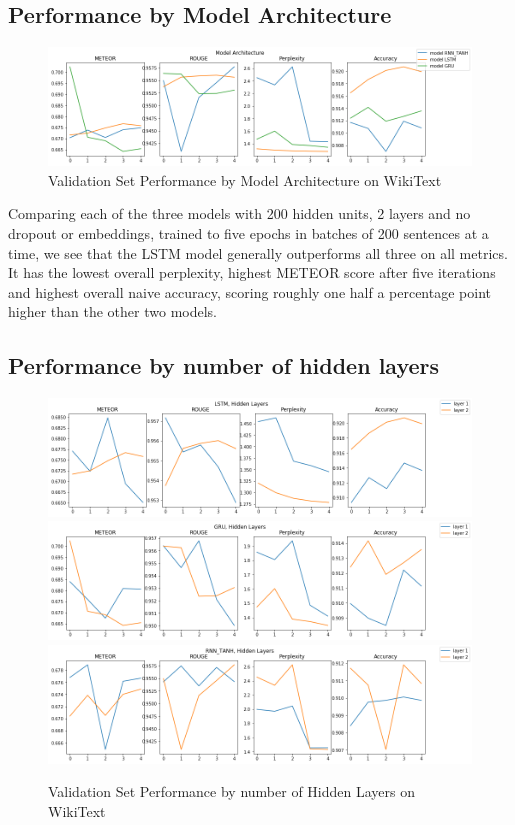 \documentclass[a4paper]{article}
\begin{document}
\subsection{Performance by Model Architecture}
\label{sec:perf_by_model_arch}

\begin{figure}[!ht]
\includegraphics[width=0.8\columnwidth]{sr-perf-by-model-architecture}
\centering
\caption{Validation Set Performance by Model Architecture on WikiText}
\end{figure}

Comparing each of the three models with 200 hidden units, 2 layers and
no dropout or embeddings, trained to five epochs in batches of 200 sentences at a
time, we see that the LSTM model generally outperforms all three on all metrics.
It has the lowest overall perplexity, highest METEOR score after five iterations
and highest overall naive accuracy, scoring roughly one half a percentage point
higher than the other two models.

\subsection{Performance by number of hidden layers}
\label{sec:perf_by_n_layers}

\begin{figure}[!ht]
\includegraphics[width=0.8\columnwidth]{sr-perf-by-hidden-lstm}
\includegraphics[width=0.8\columnwidth]{sr-perf-by-hidden-gru}
\includegraphics[width=0.8\columnwidth]{sr-perf-by-hidden-rnn}
\centering
\caption{Validation Set Performance by number of Hidden Layers on WikiText}
\end{figure}
\end{document}
